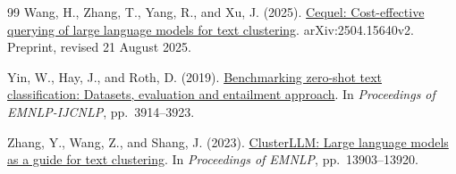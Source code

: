 \documentclass[UTF8,a4paper,zihao=-4,fontset=fandol]{ctexart}
\begin{document}
\begin{thebibliography}{99}
Wang, H., Zhang, T., Yang, R., and Xu, J. (2025).
\href{https://arxiv.org/abs/2504.15640v2}{Cequel: Cost-effective querying of large language models for text clustering}.
arXiv:2504.15640v2. Preprint, revised 21 August 2025.

Yin, W., Hay, J., and Roth, D. (2019).
\href{https://doi.org/10.18653/v1/D19-1404}{Benchmarking zero-shot text classification: Datasets, evaluation and entailment approach}.
In \emph{Proceedings of EMNLP-IJCNLP}, pp.~3914--3923.

Zhang, Y., Wang, Z., and Shang, J. (2023).
\href{https://doi.org/10.18653/v1/2023.emnlp-main.858}{ClusterLLM: Large language models as a guide for text clustering}.
In \emph{Proceedings of EMNLP}, pp.~13903--13920.

\end{thebibliography}
\end{document}
